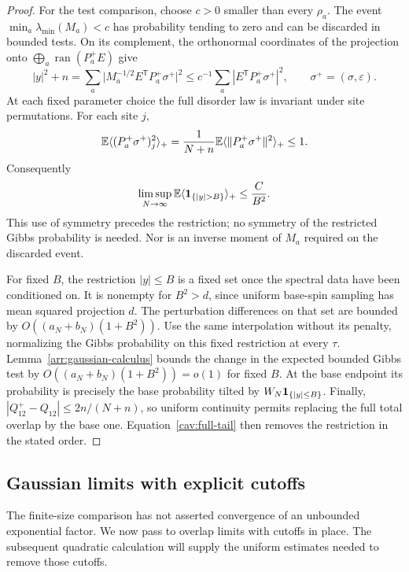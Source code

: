 \begin{proof}
For the test comparison, choose $c>0$ smaller than every $\rho_a$.
The event $\min_a\lambda_{\min}(M_a)<c$ has probability tending to
zero and can be discarded in bounded tests.  On its complement, the
orthonormal coordinates of the projection onto
$\bigoplus_a\operatorname{ran}(P_a^+E)$ give
\[
 |y|^2+n
 =\sum_a\big|M_a^{-1/2}E^{\mathsf T}P_a^+\sigma^+\big|^2
 \le c^{-1}\sum_a|E^{\mathsf T}P_a^+\sigma^+|^2,
 \qquad \sigma^+=(\sigma,\varepsilon).
\]
At each fixed parameter choice the full disorder law is invariant
under site permutations.  For each site $j$,
\[
 \mathbb E\langle(P_a^+\sigma^+)_j^2\rangle_+
 =\frac1{N+n}\mathbb E\langle\|P_a^+\sigma^+\|^2\rangle_+
 \le1.
\]
Consequently
\begin{equation}\label{cav:full-tail}
 \limsup_{N\to\infty}\E\langle\ind_{\{|y|>B\}}\rangle_+
 \le\frac{C}{B^2}.
\end{equation}
This use of symmetry precedes the restriction; no symmetry of the
restricted Gibbs probability is needed.  Nor is an inverse moment of
$M_a$ required on the discarded event.

For fixed $B$, the restriction $|y|\le B$ is a fixed set once the
spectral data have been conditioned on.  It is nonempty for $B^2>d$,
since uniform base-spin sampling has mean squared projection $d$.
The perturbation differences on that set are bounded by
$O((a_N+b_N)(1+B^2))$.  Use the same interpolation without its penalty,
normalizing the Gibbs probability on this fixed restriction at every
$\tau$.
Lemma~\ref{arr:gaussian-calculus} bounds the change in the expected
bounded Gibbs test by $O((a_N+b_N)(1+B^2))=o(1)$ for fixed $B$.
At the base endpoint its probability is precisely the base
probability tilted by $W_N\mathbf 1_{\{|y|\le B\}}$.  Finally,
$|Q_{12}^+-Q_{12}|\le2n/(N+n)$, so uniform continuity permits replacing
the full total overlap by the base one.  Equation~\eqref{cav:full-tail}
then removes the restriction in the stated order.
\end{proof}

\subsection{Gaussian limits with explicit cutoffs}

The finite-size comparison has not asserted convergence of an
unbounded exponential factor.  We now pass to overlap limits with
cutoffs in place.  The subsequent quadratic calculation will supply
the uniform estimates needed to remove those cutoffs.

